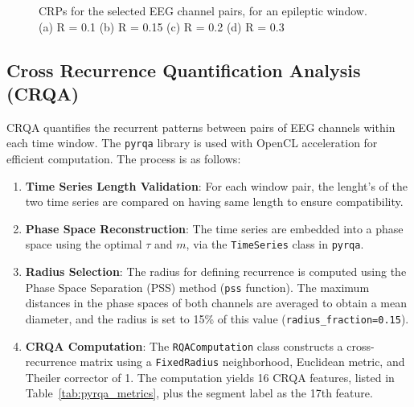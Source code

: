 \documentclass{article}
\begin{document}
\begin{figure}[htbp]
				    \caption{CRPs for the selected EEG channel pairs, for an epileptic window. (a) R = 0.1 (b) R = 0.15 (c) R = 0.2 (d) R = 0.3}
				    \label{fig:rp_grid}
				\end{figure}


				\subsection{Cross Recurrence Quantification Analysis (CRQA)}
				\label{subsec:crqa}

				CRQA quantifies the recurrent patterns between pairs of EEG channels within each time window. 
				The \texttt{pyrqa} library is used with OpenCL acceleration for efficient computation. 
				The process is as follows:

				\begin{enumerate}
				    \item \textbf{Time Series Length Validation}: For each window pair, the lenght's of the two time series 
					    are compared on having same length to ensure compatibility.
				    \item \textbf{Phase Space Reconstruction}: The time series are embedded into a phase space using the 
					    optimal \(\tau\) and \(m\), via the \texttt{TimeSeries} class in \texttt{pyrqa}.
				    \item \textbf{Radius Selection}: The radius for defining recurrence is computed using the 
					    Phase Space Separation (PSS) method (\texttt{pss} function). The maximum distances in the phase spaces 
						of both channels are averaged to obtain a mean diameter, and the radius is set 
						to 15\% of this value (\texttt{radius\_fraction=0.15}).
				    \item \textbf{CRQA Computation}: The \texttt{RQAComputation} class constructs a cross-recurrence matrix 
					    using a \texttt{FixedRadius} neighborhood, Euclidean metric, and Theiler corrector of 1. 
						The computation yields 16 CRQA features, listed in Table~\ref{tab:pyrqa_metrics}, plus the segment label as the 17th feature.
				\end{enumerate}
\end{document}
